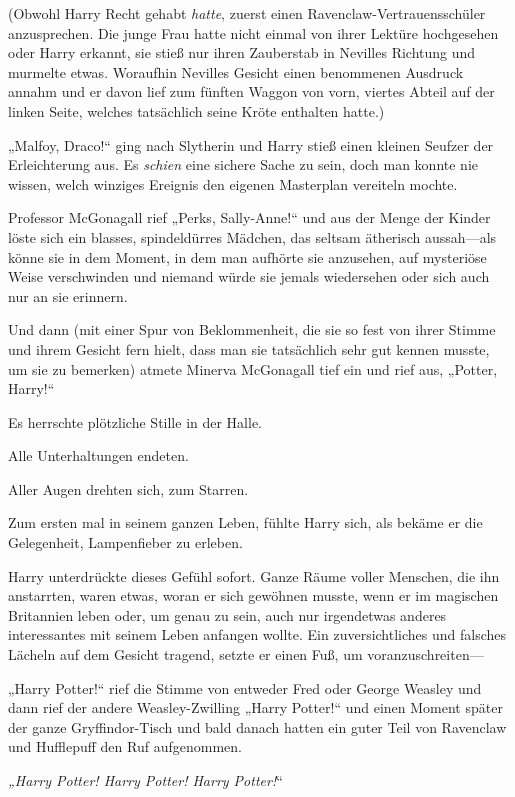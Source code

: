 {(Obwohl Harry Recht gehabt \emph{hatte}, zuerst einen Ravenclaw-Vertrauensschüler anzusprechen. Die junge Frau hatte nicht einmal von ihrer Lektüre hochgesehen oder Harry erkannt, sie stieß nur ihren Zauberstab in Nevilles Richtung und murmelte etwas. Woraufhin Nevilles Gesicht einen benommenen Ausdruck annahm und er davon lief zum fünften Waggon von vorn, viertes Abteil auf der linken Seite, welches tatsächlich seine Kröte enthalten hatte.)

„Malfoy, Draco!“ ging nach Slytherin und Harry stieß einen kleinen Seufzer der Erleichterung aus. Es \emph{schien} eine sichere Sache zu sein, doch man konnte nie wissen, welch winziges Ereignis den eigenen Masterplan vereiteln mochte.

Professor McGonagall rief „Perks, Sally-Anne!“ und aus der Menge der Kinder löste sich ein blasses, spindeldürres Mädchen, das seltsam ätherisch aussah—als könne sie in dem Moment, in dem man aufhörte sie anzusehen, auf mysteriöse Weise verschwinden und niemand würde sie jemals wiedersehen oder sich auch nur an sie erinnern.

Und dann (mit einer Spur von Beklommenheit, die sie so fest von ihrer Stimme und ihrem Gesicht fern hielt, dass man sie tatsächlich sehr gut kennen musste, um sie zu bemerken) atmete Minerva McGonagall tief ein und rief aus, „Potter, Harry!“

Es herrschte plötzliche Stille in der Halle.

Alle Unterhaltungen endeten.

Aller Augen drehten sich, zum Starren.

Zum ersten mal in seinem ganzen Leben, fühlte Harry sich, als bekäme er die Gelegenheit, Lampenfieber zu erleben.

Harry unterdrückte dieses Gefühl sofort. Ganze Räume voller Menschen, die ihn anstarrten, waren etwas, woran er sich gewöhnen musste, wenn er im magischen Britannien leben oder, um genau zu sein, auch nur irgendetwas anderes interessantes mit seinem Leben anfangen wollte. Ein zuversichtliches und falsches Lächeln auf dem Gesicht tragend, setzte er einen Fuß, um voranzuschreiten—

„Harry Potter!“ rief die Stimme von entweder Fred oder George Weasley und dann rief der andere Weasley-Zwilling „Harry Potter!“ und einen Moment später der ganze Gryffindor-Tisch und bald danach hatten ein guter Teil von Ravenclaw und Hufflepuff den Ruf aufgenommen.

\emph{„Harry Potter! Harry Potter! Harry Potter!}“

}
